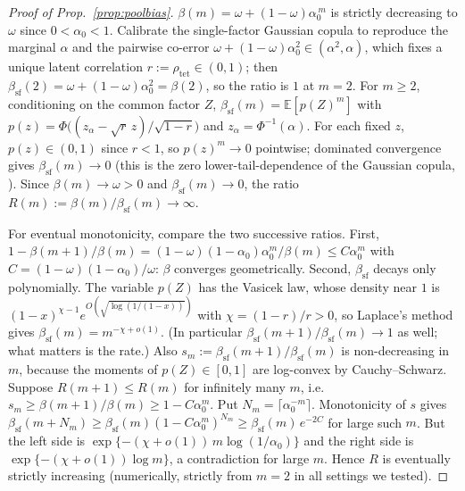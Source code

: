 \documentclass[11pt]{article}
\theoremstyle{plain}
\theoremstyle{definition}
\newcommand{\E}{\mathbb{E}}
\begin{document}
\begin{proof}[Proof of Prop.~\ref{prop:poolbias}]
$\beta(m)=\omega+(1-\omega)\alpha_0^{\,m}$ is strictly decreasing to $\omega$ since $0<\alpha_0<1$. Calibrate the single-factor Gaussian
copula to reproduce the marginal $\alpha$ and the pairwise co-error $\omega+(1-\omega)\alpha_0^2\in(\alpha^2,\alpha)$, which fixes a unique
latent correlation $r:=\rho_{\mathrm{tet}}\in(0,1)$; then $\beta_{\mathrm{sf}}(2)=\omega+(1-\omega)\alpha_0^2=\beta(2)$, so the ratio is $1$ at $m=2$. For $m\ge2$, conditioning
on the common factor $Z$, $\beta_{\mathrm{sf}}(m)=\E[p(Z)^m]$ with $p(z)=\Phi\big((z_\alpha-\sqrt{r}\,z)/\sqrt{1-r}\big)$ and
$z_\alpha=\Phi^{-1}(\alpha)$. For each fixed $z$, $p(z)\in(0,1)$ since $r<1$, so $p(z)^m\to0$ pointwise; dominated convergence gives
$\beta_{\mathrm{sf}}(m)\to0$ (this is the zero lower-tail-dependence of the Gaussian copula, \citealp{embrechts2002correlation}). Since
$\beta(m)\to\omega>0$ and $\beta_{\mathrm{sf}}(m)\to0$, the ratio $R(m):=\beta(m)/\beta_{\mathrm{sf}}(m)\to\infty$.

For eventual monotonicity, compare the two successive ratios. First, $1-\beta(m{+}1)/\beta(m)=(1-\omega)(1-\alpha_0)\alpha_0^m/\beta(m)\le C\alpha_0^m$
with $C=(1-\omega)(1-\alpha_0)/\omega$: $\beta$ converges geometrically. Second, $\beta_{\mathrm{sf}}$ decays only polynomially. The
variable $p(Z)$ has the Vasicek law, whose density near $1$ is $(1-x)^{\chi-1}e^{O(\sqrt{\log(1/(1-x))})}$ with $\chi=(1-r)/r>0$, so
Laplace's method gives $\beta_{\mathrm{sf}}(m)=m^{-\chi+o(1)}$. (In particular $\beta_{\mathrm{sf}}(m{+}1)/\beta_{\mathrm{sf}}(m)\to1$ as well;
what matters is the rate.) Also $s_m:=\beta_{\mathrm{sf}}(m{+}1)/\beta_{\mathrm{sf}}(m)$ is non-decreasing in $m$, because the moments of
$p(Z)\in[0,1]$ are log-convex by Cauchy--Schwarz. Suppose $R(m{+}1)\le R(m)$ for infinitely many $m$, i.e.\
$s_m\ge\beta(m{+}1)/\beta(m)\ge1-C\alpha_0^m$. Put $N_m=\lceil\alpha_0^{-m}\rceil$. Monotonicity of $s$ gives
$\beta_{\mathrm{sf}}(m{+}N_m)\ge\beta_{\mathrm{sf}}(m)(1-C\alpha_0^m)^{N_m}\ge\beta_{\mathrm{sf}}(m)\,e^{-2C}$ for large such $m$. But the left side is
$\exp\{-(\chi+o(1))\,m\log(1/\alpha_0)\}$ and the right side is $\exp\{-(\chi+o(1))\log m\}$, a contradiction for large $m$. Hence $R$
is eventually strictly increasing (numerically, strictly from $m{=}2$ in all settings we tested).
\end{proof}
\end{document}
